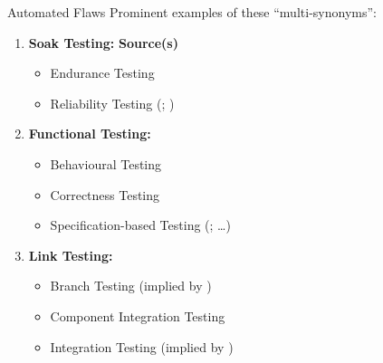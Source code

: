 \begin{frame}{Automated Flaws}
    Prominent examples of these ``multi-synonyms'': \vspace{0.25cm}
    \begin{enumerate}
        \item \textbf{Soak Testing:} \hfill \textbf{Source(s)}
              \begin{itemize}
                  \item Endurance Testing {\hfill \tiny \citep[p.~39]{IEEE2021c}}
                  \item Reliability Testing {\hfill \tiny (\citealp[Tab.~2]{Gerrard2000a};
                                \citeyear[Tab.~1, p.~26]{Gerrard2000b})}
              \end{itemize} \pause
        \item \textbf{Functional Testing:}
              \begin{itemize}
                  \item Behavioural Testing {\hfill \tiny \citep[p.~45]{Kam2008}}
                  \item Correctness Testing {\hfill \tiny \citep[p.~5\=/7]{SWEBOK2024}}
                  \item Specification-based Testing {\hfill \tiny (\citealp[p.~196]{IEEE2017}; \dots{})}
              \end{itemize} \pause
        \item \textbf{Link Testing:}
              \begin{itemize}
                  \item Branch Testing {\hfill \tiny (implied by \citealp[p.~24]{IEEE2021c})}
                  \item Component Integration Testing {\hfill \tiny \citep[p.~45]{Kam2008}}
                  \item Integration Testing {\hfill \tiny (implied by \citealp[p.~13]{Gerrard2000a})}
              \end{itemize}
    \end{enumerate}
\end{frame}
